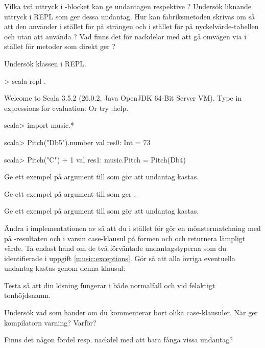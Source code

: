 \Task\label{music:exceptions}\Pen Vilka två uttryck i -blocket kan ge undantagen  respektive ? Undersök liknande uttryck i REPL som ger dessa undantag. Hur kan fabriksmetoden  skrivas om så att den använder  i stället för  på strängen och  i stället för  på nyckelvärde-tabellen och utan att använda ? Vad finns det för nackdelar med att gå omvägen via  i stället för metoder som direkt ger ?


\Task Undersök klassen  i REPL.

\begin{REPL}
> scala repl .

Welcome to Scala 3.5.2 (26.0.2, Java OpenJDK 64-Bit Server VM).
Type in expressions for evaluation. Or try :help.

scala> import music.*

scala> Pitch("Db5").number
val res0: Int = 73

scala> Pitch("C") + 1
val res1: music.Pitch = Pitch(Db4)
\end{REPL}


\Subtask\Pen Ge ett exempel på argument till  som gör att undantag kastas.

\Subtask\Pen Ge ett exempel på argument till  som ger .

\Subtask\Pen Ge ett exempel på argument till  som gör att undantag kastas.


\Task Ändra i implementationen av  så att du i stället för  gör en mönstermatchning med  på -resultaten  och  i varsin case-klausul på formen  och  och returnera lämpligt värde. Ta endast hand om de två förväntade undantagstyperna som du identifierade i uppgift \ref{music:exceptions}. Gör så att alla övriga eventuella undantag kastas genom denna klausul: 

\Subtask Testa så att din lösning fungerar i både normalfall och vid felaktigt tonhöjdsnamn.

\Subtask\Pen Undersök vad som händer om du kommenterar bort olika case-klausuler. När ger kompilatorn varning? Varför?

\Subtask\Pen Finns det någon fördel resp. nackdel med att bara fånga vissa undantag?

